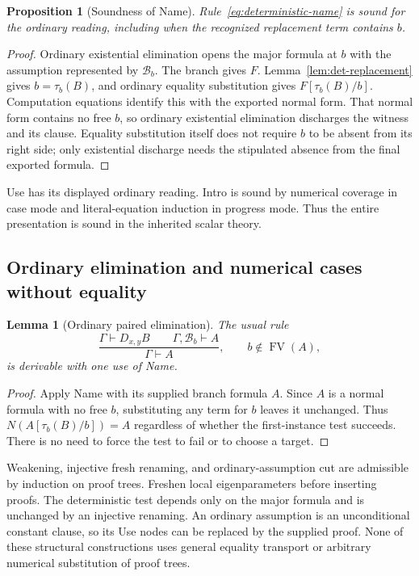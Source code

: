 \documentclass[11pt,a4paper]{article}
\newtheorem{lemma}[theorem]{Lemma}
\newtheorem{proposition}[theorem]{Proposition}
\theoremstyle{definition}\newtheorem{definition}[theorem]{Definition}
\theoremstyle{remark}\newtheorem{remark}[theorem]{Remark}
\begin{document}
\begin{proposition}[Soundness of Name]
Rule~\eqref{eq:deterministic-name} is sound for the ordinary reading,
including when the recognized replacement term contains $b$.
\end{proposition}
\begin{proof}
Ordinary existential elimination opens the major formula at $b$ with
the assumption represented by $\mathcal B_b$. The branch gives $F$.
Lemma~\ref{lem:det-replacement} gives $b=\tau_b(B)$, and ordinary equality
substitution gives $F[\tau_b(B)/b]$. Computation equations identify this
with the exported normal form. That normal form contains no free $b$,
so ordinary existential elimination discharges the witness and its clause.
Equality substitution itself does not require $b$ to be absent from its
right side; only existential discharge needs the stipulated absence from
the final exported formula.
\end{proof}

Use has its displayed ordinary reading. Intro is sound by numerical
coverage in case mode and literal-equation induction in progress mode.
Thus the entire presentation is sound in the inherited scalar theory.

\subsection{Ordinary elimination and numerical cases without equality}

\begin{lemma}[Ordinary paired elimination]
\label{lem:det-ordinary-elim}
The usual rule
\[
 \frac{\Gamma\vdash D_{x,y}B\qquad
       \Gamma,\mathcal B_b\vdash A}
      {\Gamma\vdash A},\qquad b\notin\operatorname{FV}(A),
\]
is derivable with one use of Name.
\end{lemma}
\begin{proof}
Apply Name with its supplied branch formula $A$. Since $A$ is a normal
formula with no free $b$, substituting any term for $b$ leaves it unchanged.
Thus $N(A[\tau_b(B)/b])=A$ regardless of whether the first-instance test
succeeds. There is no need to force the test to fail or to choose a target.
\end{proof}

Weakening, injective fresh renaming, and ordinary-assumption cut are
admissible by induction on proof trees. Freshen local eigenparameters
before inserting proofs. The deterministic test depends only on the
major formula and is unchanged by an injective renaming. An ordinary
assumption is an unconditional constant clause, so its Use nodes can be
replaced by the supplied proof. None of these structural constructions
uses general equality transport or arbitrary numerical substitution of
proof trees.
\end{document}
